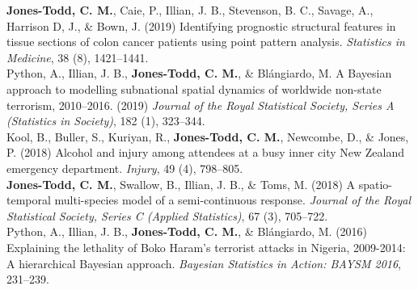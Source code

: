 \documentclass[10pt,a4paper]{moderncv}
\begin{document}
\vspace{-3pt}
 \textbf{Jones-Todd, C. M.}, Caie, P., Illian, J. B., Stevenson, B. C., Savage, A., Harrison D, J., \& Bown, J. (2019) Identifying prognostic structural features in tissue sections of colon cancer patients using point pattern analysis. \textit{Statistics in Medicine}, 38 (8), 1421--1441.\\

\vspace{-3pt}
 Python, A.,  Illian, J. B., \textbf{Jones-Todd, C. M.}, \& Bl\'{a}ngiardo, M. A Bayesian approach to modelling subnational spatial dynamics of worldwide non-state terrorism, 2010--2016. (2019) \textit{Journal of the Royal Statistical Society, Series  A (Statistics in Society)}, 182 (1), 323--344.\\

\vspace{-3pt}
Kool, B., Buller, S., Kuriyan, R., \textbf{Jones-Todd, C. M.}, Newcombe, D., \& Jones, P. (2018) Alcohol and injury among attendees at a busy inner city New Zealand emergency department. \textit{Injury}, 49 (4), 798--805.\\


 \textbf{Jones-Todd, C. M.}, Swallow, B., Illian, J. B., \& Toms, M. (2018) A spatio-temporal multi-species model of a semi-continuous response. \textit{Journal of the Royal Statistical Society, Series C (Applied Statistics)}, 67 (3), 705--722.\\

\vspace{-3pt}
Python, A.,  Illian, J. B., \textbf{Jones-Todd, C. M.}, \& Bl\'{a}ngiardo, M. (2016) Explaining the lethality of Boko Haram’s terrorist attacks in Nigeria, 2009-2014: A hierarchical Bayesian approach. \textit{Bayesian Statistics in Action: BAYSM 2016}, 231--239.\\

\newpage





\end{document}
